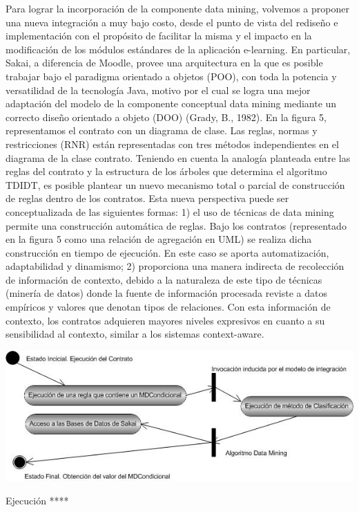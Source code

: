 \begin{itemize}
Para lograr la incorporación de la componente data mining, volvemos a proponer
una nueva integración a muy bajo costo, desde el punto de vista del
rediseño e implementación con el propósito de facilitar la misma y el impacto
en la modificación de los módulos estándares de la aplicación e-learning. En
particular, Sakai, a diferencia de Moodle, provee una arquitectura en la que es
posible trabajar bajo el paradigma orientado a objetos (POO), con toda la
potencia y versatilidad de la tecnología Java, motivo por el cual se logra una
mejor adaptación del modelo de la componente conceptual data mining
mediante un correcto diseño orientado a objeto (DOO) (Grady, B., 1982).
En la figura 5, representamos el contrato con un diagrama de clase. Las
reglas, normas y restricciones (RNR) están representadas con tres métodos
independientes en el diagrama de la clase contrato.
Teniendo en cuenta la analogía planteada entre las reglas del contrato y la
estructura de los árboles que determina el algoritmo TDIDT, es posible plantear
un nuevo mecanismo total o parcial de construcción de reglas dentro de los
contratos. Esta nueva perspectiva puede ser conceptualizada de las siguientes
formas: 1) el uso de técnicas de data mining permite una construcción automática
de reglas. Bajo los contratos (representado en la figura 5 como una
relación de agregación en UML) se realiza dicha construcción en tiempo de
ejecución. En este caso se aporta automatización, adaptabilidad y dinamismo;
2) proporciona una manera indirecta de recolección de información de contexto,
debido a la naturaleza de este tipo de técnicas (minería de datos) donde
la fuente de información procesada reviste a datos empíricos y valores que
denotan tipos de relaciones. Con esta información de contexto, los contratos
adquieren mayores niveles expresivos en cuanto a su sensibilidad al contexto,
similar a los sistemas context-aware.


\begin{center}
\includegraphics[width=6 in,totalheight=2 in]{Ch4/f4.jpg}
\caption {Ejecución ****}
\label{fig:ejecucion}
\end{center}




\end{itemize}
